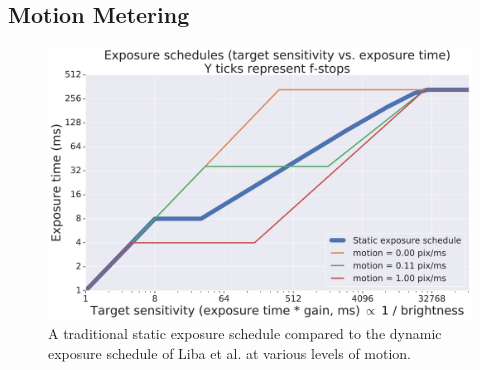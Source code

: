 \documentclass{sig-alternate}
\begin{document}


\subsection{Motion Metering}
\label{sec:motionMetering}

\begin{figure}
\centering
\includegraphics[width=\columnwidth]{figures/liba2019-figure-7.pdf}
\caption{A traditional static exposure schedule compared to the dynamic exposure schedule of Liba et al. at various levels of motion.~\cite{Liba2019}}
\label{fig:exposure}


\end{figure}
\end{document}
